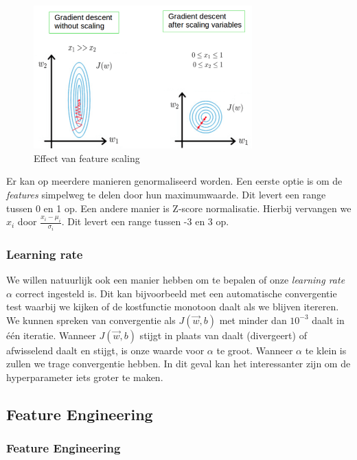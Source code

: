 \begin{figure}[h]
	\centering
	\includegraphics[width=0.75\textwidth]{images/8-feature-scaling.png}
	\caption{Effect van feature scaling}
	\label{fig:feature-scaling}
\end{figure}
\noindent
Er kan op meerdere manieren genormaliseerd worden. Een eerste optie is om de \textit{features} simpelweg te delen door hun maximumwaarde. Dit levert een range tussen 0 en 1 op. Een andere manier is Z-score normalisatie. Hierbij vervangen we $x_{i}$ door $\frac{x_{i} - \mu_{i}}{\sigma_{i}}$. Dit levert een range tussen -3 en 3 op. 

\subsubsection{Learning rate}

We willen natuurlijk ook een manier hebben om te bepalen of onze \textit{learning rate} $\alpha$ correct ingesteld is. Dit kan bijvoorbeeld met een automatische convergentie test waarbij we kijken of de kostfunctie monotoon daalt als we blijven itereren. We kunnen spreken van convergentie als $J(\vec{w},b)$ met minder dan $10^{-3}$ daalt in één iteratie. Wanneer $J(\vec{w},b)$ stijgt in plaats van daalt (divergeert) of afwisselend daalt en stijgt, is onze waarde voor $\alpha$ te groot. Wanneer $\alpha$ te klein is zullen we trage convergentie hebben. In dit geval kan het interessanter zijn om de hyperparameter iets groter te maken. 

\subsection{Feature Engineering}

\subsubsection{Feature Engineering}

